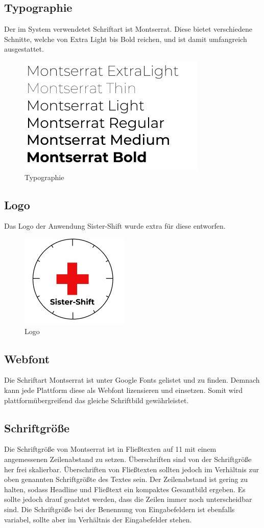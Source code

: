 \documentclass[11pt,
paper=a4,
bibtotocnumbered,	  %
liststotocnumbered,  %
DIV=calc,		  %
tablecaptionabove,	  %
headinclude,
]{article}
\begin{document}
\subsection{Typographie}
Der im System verwendetet Schriftart ist Montserrat. Diese bietet verschiedene Schnitte, welche von Extra Light bis Bold reichen, und ist damit umfangreich ausgestattet.
\begin{figure}[H]
\includegraphics[scale=1]{Bilder/Typographie.jpg}
\caption{Typographie}
\end{figure}
\subsection{Logo}
Das Logo der Anwendung Sister-Shift wurde extra für diese entworfen. 
\begin{figure}[H]
\includegraphics[scale=1]{Bilder/Logo.jpg}
\caption{Logo}
\end{figure}
\subsection{Webfont}
Die Schriftart Montserrat ist unter Google Fonts gelistet und zu finden. Demnach kann jede Plattform diese als Webfont lizensieren und einsetzen. Somit wird plattformübergreifend das gleiche Schriftbild gewährleistet.
\subsection{Schriftgröße}
Die Schriftgröße von Montserrat ist in Fließtexten auf 11 mit einem angemessenen Zeilenabstand zu setzen. Überschriften sind von der Schriftgröße her frei skalierbar. Überschriften von Fließtexten sollten jedoch im Verhältnis zur oben genannten Schriftgrößte des Textes sein. Der Zeilenabstand ist gering zu halten, sodass Headline und Fließtext ein kompaktes Gesamtbild ergeben. Es sollte jedoch drauf geachtet werden, dass die Zeilen immer noch unterscheidbar sind. Die Schriftgröße bei der Benennung von Eingabefeldern ist ebenfalls variabel, sollte aber im Verhältnis der Eingabefelder stehen.
\end{document}
